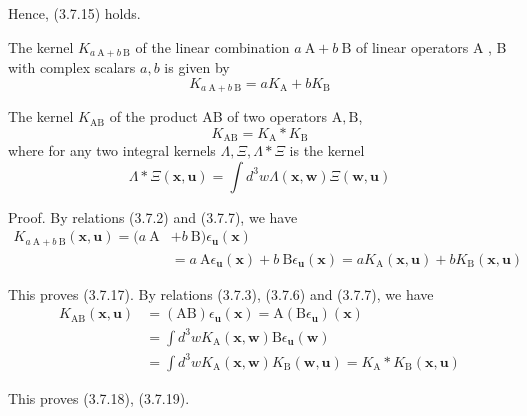 \documentclass{article}
\begin{document}
Hence, (3.7.15) holds.

The kernel $K_{a \mathrm{~A}+b \mathrm{~B}}$ of the linear combination $a \mathrm{~A}+b \mathrm{~B}$ of linear operators A , B with complex scalars $a, b$ is given by
$$
\begin{equation*}
K_{a \mathrm{~A}+b \mathrm{~B}}=a K_{\mathrm{A}}+b K_{\mathrm{B}} \tag{3.7.17}
\end{equation*}
$$

The kernel $K_{\mathrm{AB}}$ of the product AB of two operators $\mathrm{A}, \mathrm{B}$,
$$
\begin{equation*}
K_{\mathrm{AB}}=K_{\mathrm{A}} * K_{\mathrm{B}} \tag{3.7.18}
\end{equation*}
$$
where for any two integral kernels $\Lambda, \Xi, \Lambda * \Xi$ is the kernel
$$
\begin{equation*}
\Lambda * \Xi(\boldsymbol{x}, \boldsymbol{u})=\int d^{3} w \Lambda(\boldsymbol{x}, \boldsymbol{w}) \Xi(\boldsymbol{w}, \boldsymbol{u}) \tag{3.7.19}
\end{equation*}
$$

Proof. By relations (3.7.2) and (3.7.7), we have
$$
\begin{align*}
K_{a \mathrm{~A}+b \mathrm{~B}}(\boldsymbol{x}, \boldsymbol{u})=(a \mathrm{~A} & +b \mathrm{~B}) \epsilon_{\boldsymbol{u}}(\boldsymbol{x}) \\
& =a \mathrm{~A} \epsilon_{\boldsymbol{u}}(\boldsymbol{x})+b \mathrm{~B} \epsilon_{\boldsymbol{u}}(\boldsymbol{x})=a K_{\mathrm{A}}(\boldsymbol{x}, \boldsymbol{u})+b K_{\mathrm{B}}(\boldsymbol{x}, \boldsymbol{u})
\end{align*}
$$

This proves (3.7.17).
By relations (3.7.3), (3.7.6) and (3.7.7), we have
$$
\begin{align*}
K_{\mathrm{AB}}(\boldsymbol{x}, \boldsymbol{u}) & =(\mathrm{AB}) \epsilon_{\boldsymbol{u}}(\boldsymbol{x})=\mathrm{A}\left(\mathrm{B} \epsilon_{\boldsymbol{u}}\right)(\boldsymbol{x})  \tag{3.7.21}\\
& =\int d^{3} w K_{\mathrm{A}}(\boldsymbol{x}, \boldsymbol{w}) \mathrm{B} \epsilon_{\boldsymbol{u}}(\boldsymbol{w}) \\
& =\int d^{3} w K_{\mathrm{A}}(\boldsymbol{x}, \boldsymbol{w}) K_{\mathrm{B}}(\boldsymbol{w}, \boldsymbol{u})=K_{\mathrm{A}} * K_{\mathrm{B}}(\boldsymbol{x}, \boldsymbol{u})
\end{align*}
$$

This proves (3.7.18), (3.7.19).
\end{document}

